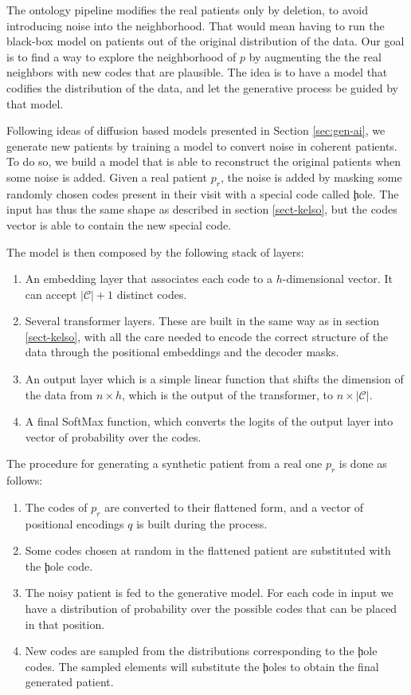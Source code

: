 \documentclass[]{marticle}
\newcommand{\codes}{\mathcal{C}}
\begin{document}
The ontology pipeline modifies the real patients only by deletion, to avoid introducing noise into
the neighborhood. That would mean having to run the black-box model on patients out of the original
distribution of the data. Our goal is to find a way to explore the neighborhood of $p$ by augmenting
the the real neighbors with new codes that are plausible. The idea is to have a model that codifies
the distribution of the data, and let the generative process be guided by that model.

Following ideas of diffusion based models presented in Section \ref{sec:gen-ai}, we generate new
patients by training a model to convert noise in coherent patients. To do so, we build a model that
is able to reconstruct the original patients when some noise is added. Given a real patient $p_r$,
the noise is added by masking some randomly chosen codes present in their visit with a special code
called \c{hole}. The input has thus the same shape as described in section \ref{sect-kelso}, but the
codes vector is able to contain the new special code.

The model is then composed by the following stack of layers:
\begin{enumerate}
\item An embedding layer that associates each code to a $h$-dimensional vector. It can accept
$|\codes|+1$ distinct codes.

\item Several transformer layers. These are built in the same way as in section \ref{sect-kelso},
with all the care needed to encode the correct structure of the data through the positional
embeddings and the decoder masks.

\item An output layer which is a simple linear function that shifts the dimension of the data from
$n \times h$, which is the output of the transformer, to $n \times |\codes|$.

\item A final SoftMax function, which converts the logits of the output layer into vector of
probability over the codes.
\end{enumerate}

The procedure for generating a synthetic patient from a real one $p_r$ is done as follows:
\begin{enumerate}
\item The codes of $p_r$ are converted to their flattened form, and a vector of positional encodings
$q$ is built during the process.

\item Some codes chosen at random in the flattened patient are substituted with the \c{hole} code.

\item The noisy patient is fed to the generative model. For each code in input we have a
distribution of probability over the possible codes that can be placed in that position. 

\item New codes are sampled from the distributions corresponding to the \c{hole} codes. The sampled
elements will substitute the \c{hole}s to obtain the final generated patient.
\end{enumerate}
\end{document}
